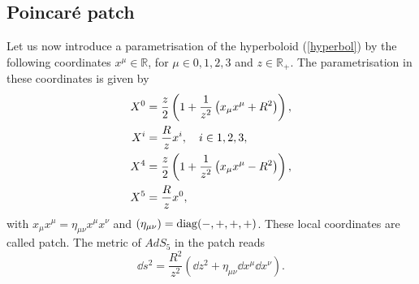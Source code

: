 \subsection{Poincaré patch}\label{p_patch}
Let us now introduce a parametrisation of the hyperboloid (\ref{hyperbol}) by the following coordinates $x^{\mu} \in \mathbb{R}$, for $\mu \in {0,1,2,3}$ and $z \in \mathbb{R}_{+}$. The parametrisation in these coordinates is given by
\begin{align}
X^{0} &= \frac{z}{2} \left( 1+ \frac{1}{z^{2}}\left( x_{\mu}x^{\mu} + R^{2}\right) \right), \notag \\
X^{i} &= \frac{R}{z}x^{i},\quad i\in {1,2,3}, \\
X^{4} &= \frac{z}{2} \left( 1 + \frac{1}{z^{2}} \left(x_{\mu}x^{\mu} -R^{2} \right) \right), \notag \\
X^{5} &= \frac{R}{z}x^{0}, \notag
\end{align}
with $x_{\mu}x^{\mu}=\eta_{\mu\nu}x^{\mu}x^{\nu}$ and $\left(\eta_{\mu \nu}\right) = {\rm diag}(-,+,+,+)$. These local coordinates are called  patch. The metric of $AdS_{5}$ in the  patch reads
\begin{equation}
\dd s^{2} = \frac{R^{2}}{z^{2}}\left(\dd z^{2} + \eta_{\mu \nu} \dd x^{\mu} \dd x^{\nu} \right).
\end{equation}
%
%
%
%
%
%
